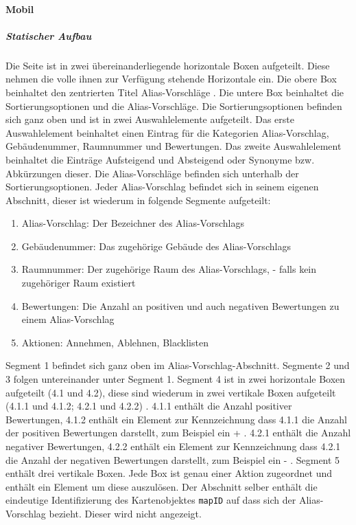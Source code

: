 \paragraph*{Mobil}
\subparagraph*{Statischer Aufbau}
Die Seite ist in zwei übereinanderliegende horizontale Boxen aufgeteilt. Diese nehmen die volle ihnen zur Verfügung stehende Horizontale ein.
Die obere Box beinhaltet den zentrierten Titel \dq Alias-Vorschläge \dq.
Die untere Box beinhaltet die Sortierungsoptionen und die Alias-Vorschläge.
Die Sortierungsoptionen befinden sich ganz oben und ist in zwei Auswahlelemente aufgeteilt. 
Das erste Auswahlelement beinhaltet einen Eintrag für die Kategorien Alias-Vorschlag, Gebäudenummer, Raumnummer und Bewertungen.
Das zweite Auswahlelement beinhaltet die Einträge \dq Aufsteigend \dq{} und \dq Absteigend \dq{} oder Synonyme bzw. Abkürzungen dieser.
Die Alias-Vorschläge befinden sich unterhalb der Sortierungsoptionen.
Jeder Alias-Vorschlag befindet sich in seinem eigenen Abschnitt, dieser ist wiederum in folgende Segmente aufgeteilt:

\begin{enumerate}
    \item Alias-Vorschlag: Der Bezeichner des Alias-Vorschlags
    \item Gebäudenummer: Das zugehörige Gebäude des Alias-Vorschlags
    \item Raumnummer: Der zugehörige Raum des Alias-Vorschlags, \dq - \dq{} falls kein zugehöriger Raum existiert
    \item Bewertungen: Die Anzahl an positiven und auch negativen Bewertungen zu einem Alias-Vorschlag
    \item Aktionen: Annehmen, Ablehnen, Blacklisten
\end{enumerate}

Segment 1 befindet sich ganz oben im Alias-Vorschlag-Abschnitt. Segmente 2 und 3 folgen untereinander unter Segment 1.
Segment 4 ist in zwei horizontale Boxen aufgeteilt (4.1 und 4.2), diese sind wiederum in zwei vertikale Boxen aufgeteilt (4.1.1 und 4.1.2; 4.2.1 und 4.2.2) .
4.1.1 enthält die Anzahl positiver Bewertungen, 4.1.2 enthält ein Element zur Kennzeichnung dass 4.1.1 die Anzahl der positiven Bewertungen darstellt, zum Beispiel ein \dq + \dq.
4.2.1 enthält die Anzahl negativer Bewertungen, 4.2.2 enthält ein Element zur Kennzeichnung dass 4.2.1 die Anzahl der negativen Bewertungen darstellt, zum Beispiel ein \dq - \dq.
Segment 5 enthält drei vertikale Boxen. Jede Box ist genau einer Aktion zugeordnet und enthält ein Element um diese auszulösen.
Der Abschnitt selber enthält die eindeutige Identifizierung des Kartenobjektes \verb#mapID# auf dass sich der Alias-Vorschlag bezieht. Dieser wird nicht angezeigt.

